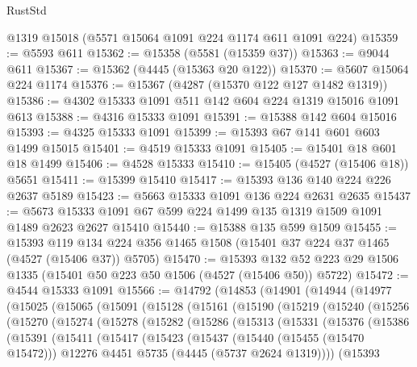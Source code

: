\begin{lexlean}{RustStd}
\begin{coremodule}
    @1319
    @15018
    (@5571 @15064 @1091 @224 @1174 @611 @1091 @224)
@15359 := @5593 @611
@15362 := @15358 (@5581 (@15359 @37))
@15363 := @9044 @611
@15367 := @15362 (@4445 (@15363 @20 @122))
@15370 := @5607 @15064 @224 @1174
@15376 := @15367 (@4287 (@15370 @122 @127 @1482 @1319))
@15386 := @4302 @15333 @1091 @511 @142 @604 @224 @1319 @15016 @1091 @613
@15388 := @4316 @15333 @1091
@15391 := @15388 @142 @604 @15016
@15393 := @4325 @15333 @1091
@15399 := @15393 @67 @141 @601 @603 @1499 @15015
@15401 := @4519 @15333 @1091
@15405 := @15401 @18 @601 @18 @1499
@15406 := @4528 @15333
@15410 := @15405 (@4527 (@15406 @18)) @5651
@15411 := @15399 @15410
@15417 := @15393 @136 @140 @224 @226 @2637 @5189
@15423 := @5663 @15333 @1091 @136 @224 @2631 @2635
@15437 := @5673 @15333 @1091 @67 @599 @224 @1499 @135 @1319 @1509 @1091 @1489 @2623 @2627 @15410
@15440 := @15388 @135 @599 @1509
@15455 := @15393
    @119
    @134
    @224
    @356
    @1465
    @1508
    (@15401 @37 @224 @37 @1465 (@4527 (@15406 @37)) @5705)
@15470 := @15393
    @132
    @52
    @223
    @29
    @1506
    @1335
    (@15401 @50 @223 @50 @1506 (@4527 (@15406 @50)) @5722)
@15472 := @4544 @15333 @1091
@15566 := @14792
    (@14853
      (@14901
        (@14944
          (@14977
            (@15025
              (@15065
                (@15091
                  (@15128
                    (@15161
                      (@15190
                        (@15219
                          (@15240
                            (@15256
                              (@15270
                                (@15274
                                  (@15278
                                    (@15282
                                      (@15286
                                        (@15313
                                          (@15331
                                            (@15376
                                              (@15386
                                                (@15391
                                                  (@15411
                                                    (@15417
                                                      (@15423
                                                        (@15437
                                                          (@15440 (@15455 (@15470 @15472)))
                                                          @12276
                                                          @4451
                                                          @5735
                                                          (@4445 (@5737 @2624 @1319))))
                                                      (@15393

\end{coremodule}
\end{lexlean}
